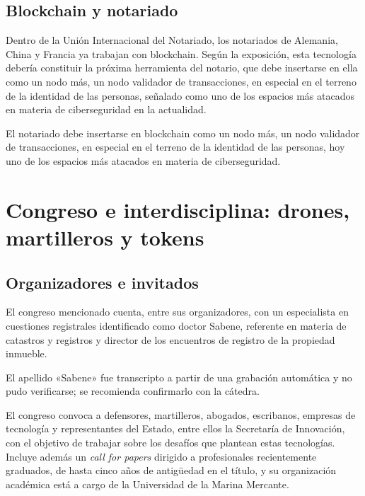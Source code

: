 \documentclass[12pt,oneside]{book}
\begin{document}
\subsection{Blockchain y notariado}

Dentro de la Unión Internacional del Notariado, los notariados de Alemania, China y Francia ya trabajan con blockchain. Según la exposición, esta tecnología debería constituir la próxima herramienta del notario, que debe insertarse en ella como un nodo más, un nodo validador de transacciones, en especial en el terreno de la identidad de las personas, señalado como uno de los espacios más atacados en materia de ciberseguridad en la actualidad.

\begin{important}
El notariado debe insertarse en blockchain como un nodo más, un nodo validador de transacciones, en especial en el terreno de la identidad de las personas, hoy uno de los espacios más atacados en materia de ciberseguridad.
\end{important}

\section{Congreso e interdisciplina: drones, martilleros y tokens}

\subsection{Organizadores e invitados}

El congreso mencionado cuenta, entre sus organizadores, con un especialista en cuestiones registrales identificado como doctor Sabene, referente en materia de catastros y registros y director de los encuentros de registro de la propiedad inmueble.

\begin{note}
El apellido «Sabene» fue transcripto a partir de una grabación automática y no pudo verificarse; se recomienda confirmarlo con la cátedra.
\end{note}

El congreso convoca a defensores, martilleros, abogados, escribanos, empresas de tecnología y representantes del Estado, entre ellos la Secretaría de Innovación, con el objetivo de trabajar sobre los desafíos que plantean estas tecnologías. Incluye además un \textit{call for papers} dirigido a profesionales recientemente graduados, de hasta cinco años de antigüedad en el título, y su organización académica está a cargo de la Universidad de la Marina Mercante.
\end{document}

